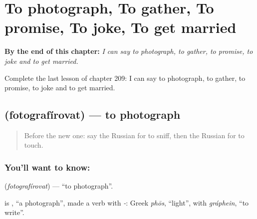 
\chapter{To photograph, To gather, To promise, To joke, To get married}
\label{ch:ru-to-photograph-to-gather-to-promise-to-joke-to-get-married}

\begin{chapteropening}
\textbf{By the end of this chapter:} \emph{I can say to photograph, to gather, to promise, to joke and to get married.}

Complete the last lesson of chapter 209: I can say to photograph, to gather, to promise, to joke and to get married.
\end{chapteropening}

\section[\texorpdfstring{\ru{фотографировать} (fotografírovat)}{фотографировать (fotografírovat)}]{ (fotografírovat) — to photograph}

\label{lesson:RU-C209-fotografirovat}



\begin{quote}
Before the new one: say the Russian for to sniff, then the Russian for to touch.
\end{quote}

\subsection*{You'll want to know: }
\textbf{} (\emph{fotografírovat}) — \textquotedblleft{}to photograph\textquotedblright{}.

\begin{cousinweb}
\textbf{} is \emph{}, \textquotedblleft{}a photograph\textquotedblright{}, made a verb with \emph{-}: Greek \emph{phōs}, \textquotedblleft{}light\textquotedblright{}, with \emph{gráphein}, \textquotedblleft{}to write\textquotedblright{}.
\end{cousinweb}

